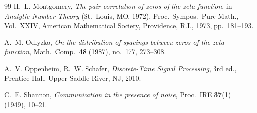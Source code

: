 \documentclass[11pt,reqno]{amsart}
\theoremstyle{plain}
\theoremstyle{definition}
\theoremstyle{remark}
\begin{document}
\begin{thebibliography}{99}
H.~L. Montgomery, \emph{The pair correlation of zeros of the zeta
function}, in \emph{Analytic Number Theory} (St.~Louis, MO, 1972),
Proc.~Sympos.~Pure Math., Vol.~XXIV, American Mathematical Society,
Providence, R.I., 1973, pp.~181--193.

A.~M. Odlyzko, \emph{On the distribution of spacings between zeros
of the zeta function}, Math.\ Comp.\ \textbf{48} (1987), no.~177,
273--308.

A.~V. Oppenheim, R.~W. Schafer, \emph{Discrete-Time Signal
Processing}, 3rd ed., Prentice Hall, Upper Saddle River, NJ, 2010.

C.~E. Shannon, \emph{Communication in the presence of noise},
Proc.~IRE \textbf{37}(1) (1949), 10--21.

\end{thebibliography}
\end{document}
